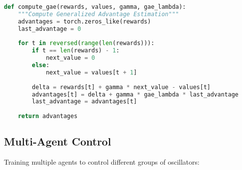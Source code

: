 \begin{lstlisting}[language=python, caption=PPO Training Example]
def compute_gae(rewards, values, gamma, gae_lambda):
    """Compute Generalized Advantage Estimation"""
    advantages = torch.zeros_like(rewards)
    last_advantage = 0
    
    for t in reversed(range(len(rewards))):
        if t == len(rewards) - 1:
            next_value = 0
        else:
            next_value = values[t + 1]
        
        delta = rewards[t] + gamma * next_value - values[t]
        advantages[t] = delta + gamma * gae_lambda * last_advantage
        last_advantage = advantages[t]
    
    return advantages
\end{lstlisting}

\subsection{Multi-Agent Control}

Training multiple agents to control different groups of oscillators:

